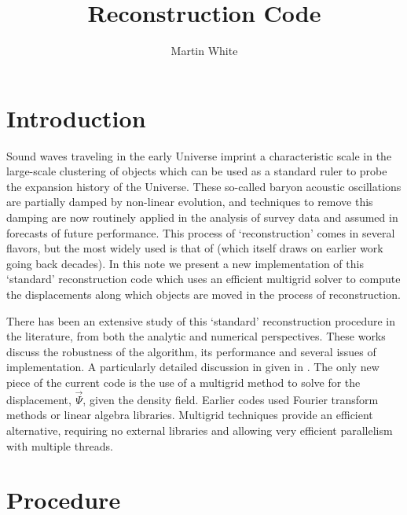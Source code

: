 \documentclass[a4paper,11pt]{article}
\author[a,b]{Martin White}
\affiliation[a]{Department of Physics, University of California,
Berkeley, CA}
\affiliation[b]{Lawrence Berkeley Laboratory, 1 Cyclotron Road,
Berkeley, CA}
\title{Reconstruction Code}
\begin{document}
\maketitle
\flushbottom

\section{Introduction}
\label{sec:intro}

Sound waves traveling in the early Universe imprint a characteristic
scale in the large-scale clustering of objects which can be used as a
standard ruler to probe the expansion history of the Universe.  These
so-called baryon acoustic oscillations are partially damped by
non-linear evolution, and techniques to remove this damping are now
routinely applied in the analysis of survey data and assumed in
forecasts of future performance.  This process of `reconstruction'
comes in several flavors, but the most widely used is that of
\cite{Eis07} (which itself draws on earlier work going back decades).
In this note we present a new implementation of this `standard'
reconstruction code which uses an efficient multigrid solver to
compute the displacements along which objects are moved in the process
of reconstruction.

There has been an extensive study of this `standard' reconstruction procedure
in the literature, from both the analytic \cite{PWC09,NWP09,TasZal12,ZelRecon}
and numerical \cite{Seo10,Pad12,Xu13,Bur14,Toj14,Var14,Bur15} perspectives.
These works discuss the robustness of the algorithm, its performance and
several issues of implementation.
A particularly detailed discussion in given in \cite{Pad12,Bur14,Bur15}.
The only new piece of the current code is the use of a multigrid method to
solve for the displacement, $\vec{\Psi}$, given the density field.  Earlier
codes used Fourier transform methods or linear algebra libraries.  Multigrid
techniques provide an efficient alternative, requiring no external
libraries and allowing very efficient parallelism with multiple threads.

\section{Procedure}
\end{document}
